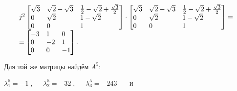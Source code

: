 \documentclass[a4paper]{article}
\begin{document}
\begin{equation*}
\begin{matrix}j^2\left[\begin{matrix}\sqrt 3\hfill\null &\sqrt 2-\sqrt 3\hfill\null &\frac 1 2-\sqrt 2+\frac{\sqrt 3}
2\hfill\null \\0\hfill\null &\sqrt 2\hfill\null &1-\sqrt 2\hfill\null \\0\hfill\null &0\hfill\null &1\hfill\null
\end{matrix}\right]\cdot \left[\begin{matrix}\sqrt 3\hfill\null &\sqrt 2-\sqrt 3\hfill\null &\frac 1 2-\sqrt
2+\frac{\sqrt 3} 2\hfill\null \\0\hfill\null &\sqrt 2\hfill\null &1-\sqrt 2\hfill\null \\0\hfill\null &0\hfill\null
&1\hfill\null \end{matrix}\right]=\hfill\null \\=\left[\begin{matrix}-3\hfill\null &1\hfill\null &0\hfill\null
\\0\hfill\null &-2\hfill\null &1\hfill\null \\0\hfill\null &0\hfill\null &-1\hfill\null \end{matrix}\right].\hfill\null
\end{matrix}\hfill 
\end{equation*}

\bigskip

{\begin{russian}\sffamily
Для той же матрицы найдём  $A^5$:
\end{russian}}

{\begin{russian}\sffamily
 $λ_1^5=-1\;,\;\;\;\;\;λ_2^5=-32\;,\;\;\;\;\;λ_3^5=-243$ \ \ \ и
\end{russian}}
\end{document}
